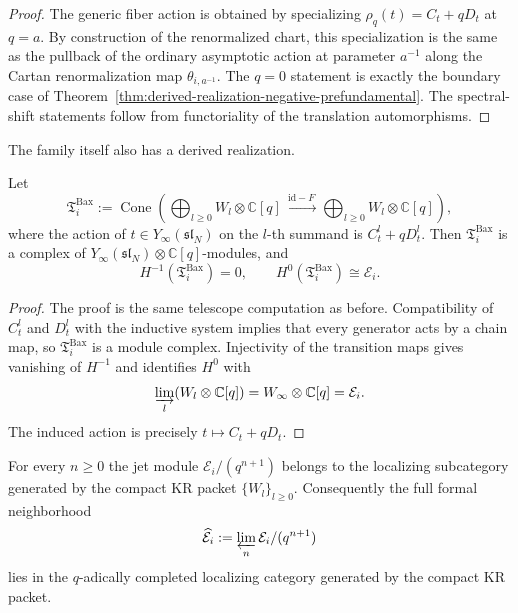 \begin{proof}
The generic fiber action is obtained by specializing
$\rho_q(t)=C_t+qD_t$ at $q=a$. By construction of the renormalized chart,
this specialization is the same as the pullback of the ordinary
asymptotic action at parameter $a^{-1}$ along the Cartan renormalization
map $\theta_{i,a^{-1}}$. The $q=0$ statement is exactly the boundary case
of Theorem~\ref{thm:derived-realization-negative-prefundamental}. The
spectral-shift statements follow from functoriality of the translation
automorphisms.
\end{proof}

The family itself also has a derived realization.

\begin{theorem}
\ClaimStatusProvedHere
\label{thm:derived-realization-baxter-rees-family}
Let
\begin{equation}
\mathfrak T_i^{\mathrm{Bax}}
:=
\operatorname{Cone}\!\left(
\bigoplus_{l\ge 0}W_l\otimes \mathbb C[q]
\xrightarrow{\ \mathrm{id}-F\ }
\bigoplus_{l\ge 0}W_l\otimes \mathbb C[q]
\right),
\end{equation}
where the action of $t\in Y_\infty(\mathfrak{sl}_N)$ on the $l$-th summand
is $C_t^l+qD_t^l$. Then
$\mathfrak T_i^{\mathrm{Bax}}$ is a complex of
$Y_\infty(\mathfrak{sl}_N)\otimes\mathbb C[q]$-modules, and
\begin{equation}
H^{-1}(\mathfrak T_i^{\mathrm{Bax}})=0,
\qquad
H^0(\mathfrak T_i^{\mathrm{Bax}})\cong \mathcal E_i.
\end{equation}
\end{theorem}

\begin{proof}
The proof is the same telescope computation as before. Compatibility of
$C_t^l$ and $D_t^l$ with the inductive system implies that every generator
acts by a chain map, so $\mathfrak T_i^{\mathrm{Bax}}$ is a module complex.
Injectivity of the transition maps gives vanishing of $H^{-1}$ and
identifies $H^0$ with
\begin{equation}
\varinjlim_l (W_l\otimes \mathbb C[q])=W_\infty\otimes \mathbb C[q]=\mathcal E_i.
\end{equation}
The induced action is precisely $t\mapsto C_t+qD_t$.
\end{proof}

\begin{corollary}
\ClaimStatusProvedHere
\label{cor:formal-neighborhood-generated-by-KR}
For every $n\ge 0$ the jet module $\mathcal E_i/(q^{n+1})$ belongs to the
localizing subcategory generated by the compact KR packet
$\{W_l\}_{l\ge 0}$. Consequently the full formal neighborhood
\begin{equation}
\widehat{\mathcal E}_i:=\varprojlim_n \mathcal E_i/(q^{n+1})
\end{equation}
lies in the $q$-adically completed localizing category generated by the
compact KR packet.
\end{corollary}

